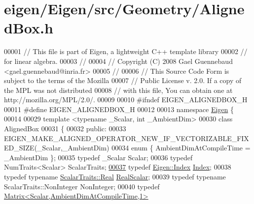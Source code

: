 \hypertarget{eigen_2_eigen_2src_2_geometry_2_aligned_box_8h_source}{}\section{eigen/\+Eigen/src/\+Geometry/\+Aligned\+Box.h}
\label{eigen_2_eigen_2src_2_geometry_2_aligned_box_8h_source}

\begin{DoxyCode}
00001 \textcolor{comment}{// This file is part of Eigen, a lightweight C++ template library}
00002 \textcolor{comment}{// for linear algebra.}
00003 \textcolor{comment}{//}
00004 \textcolor{comment}{// Copyright (C) 2008 Gael Guennebaud <gael.guennebaud@inria.fr>}
00005 \textcolor{comment}{//}
00006 \textcolor{comment}{// This Source Code Form is subject to the terms of the Mozilla}
00007 \textcolor{comment}{// Public License v. 2.0. If a copy of the MPL was not distributed}
00008 \textcolor{comment}{// with this file, You can obtain one at http://mozilla.org/MPL/2.0/.}
00009 
00010 \textcolor{preprocessor}{#ifndef EIGEN\_ALIGNEDBOX\_H}
00011 \textcolor{preprocessor}{#define EIGEN\_ALIGNEDBOX\_H}
00012 
00013 \textcolor{keyword}{namespace }\hyperlink{namespace_eigen}{Eigen} \{ 
00014 
00029 \textcolor{keyword}{template} <\textcolor{keyword}{typename} \_Scalar, \textcolor{keywordtype}{int} \_AmbientDim>
00030 \textcolor{keyword}{class }AlignedBox
00031 \{
00032 \textcolor{keyword}{public}:
00033 EIGEN\_MAKE\_ALIGNED\_OPERATOR\_NEW\_IF\_VECTORIZABLE\_FIXED\_SIZE(\_Scalar,\_AmbientDim)
00034   \textcolor{keyword}{enum} \{ AmbientDimAtCompileTime = \_AmbientDim \};
00035   \textcolor{keyword}{typedef} \_Scalar                                   Scalar;
00036   \textcolor{keyword}{typedef} NumTraits<Scalar>                         ScalarTraits;
\hyperlink{group___geometry___module_a774ef355da13d6bee6a6e7244c15231a}{00037}   \textcolor{keyword}{typedef} \hyperlink{namespace_eigen_a62e77e0933482dafde8fe197d9a2cfde}{Eigen::Index}                              \hyperlink{group___geometry___module_a774ef355da13d6bee6a6e7244c15231a}{Index}; 
00038   \textcolor{keyword}{typedef} \textcolor{keyword}{typename} \hyperlink{group___sparse_core___module}{ScalarTraits::Real}               \hyperlink{group___sparse_core___module}{RealScalar};
00039   \textcolor{keyword}{typedef} \textcolor{keyword}{typename} ScalarTraits::NonInteger         NonInteger;
00040   \textcolor{keyword}{typedef} \hyperlink{group___core___module}{Matrix<Scalar,AmbientDimAtCompileTime,1>}  

\end{DoxyCode}
